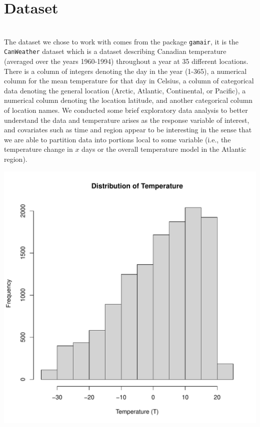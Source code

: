 \documentclass[aoas]{imsart}\usepackage[]{graphicx}\usepackage[]{xcolor}
\newenvironment{knitrout}{}{} %
\begin{document}
\section{Dataset}\hfill\\

The dataset we chose to work with comes from the package \texttt{gamair}, it is the \texttt{CanWeather} dataset which is a dataset describing Canadian temperature (averaged over the years 1960-1994) throughout a year at 35 different locations. There is a column of integers denoting the day in the year (1-365), a numerical column for the mean temperature for that day in Celsius, a column of categorical data denoting the general location (Arctic, Atlantic, Continental, or Pacific), a numerical column denoting the location latitude, and another categorical column of location names. We conducted some brief exploratory data analysis to better understand the data and temperature arises as the response variable of interest, and covariates such as time and region appear to be interesting in the sense that we are able to partition data into portions local to some variable (i.e., the temperature change in $x$ days or the overall temperature model in the Atlantic region).
\begin{knitrout}
\color{fgcolor}

{\centering \includegraphics[width=0.7\linewidth,height=0.45\textheight]{figure/unnamed-chunk-2-1} 

}


\end{knitrout}
\end{document}
